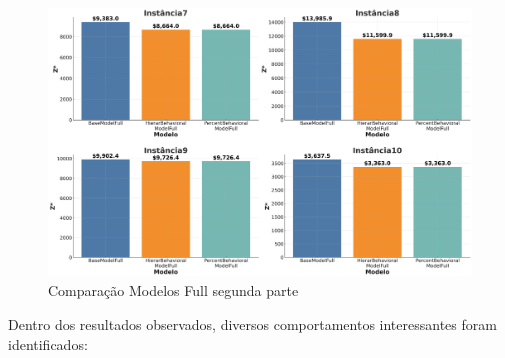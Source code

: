 \begin{figure}[!ht]
	\begin{center}
		\includegraphics[scale=0.28]{img/compFull2.png}
		\caption{Comparação Modelos Full segunda parte}
		\label{fig: compfull2}
	\end{center}
\end{figure}


Dentro dos resultados observados, diversos comportamentos interessantes foram identificados:

